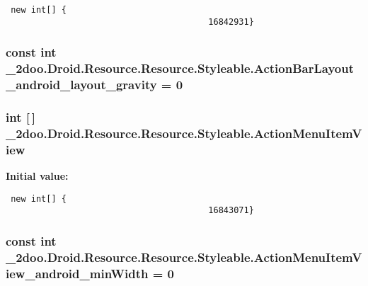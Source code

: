 \begin{Code}\begin{verbatim} new int[] {
                                        16842931}
\end{verbatim}
\end{Code}
\hypertarget{class__2doo_1_1_droid_1_1_resource_1_1_styleable_0f6e770bdc63ad746aa4b029ad1a8c27}{
\subsubsection[{ActionBarLayout\_\-android\_\-layout\_\-gravity}]{\setlength{\rightskip}{0pt plus 5cm}const int \_\-2doo.Droid.Resource.Resource.Styleable.ActionBarLayout\_\-android\_\-layout\_\-gravity = 0}}
\label{class__2doo_1_1_droid_1_1_resource_1_1_styleable_0f6e770bdc63ad746aa4b029ad1a8c27}


\hypertarget{class__2doo_1_1_droid_1_1_resource_1_1_styleable_e077d3be702fe927951e38340a8e8f7c}{
\subsubsection[{ActionMenuItemView}]{\setlength{\rightskip}{0pt plus 5cm}int \mbox{[}$\,$\mbox{]} \_\-2doo.Droid.Resource.Resource.Styleable.ActionMenuItemView}}
\label{class__2doo_1_1_droid_1_1_resource_1_1_styleable_e077d3be702fe927951e38340a8e8f7c}


\textbf{Initial value:}

\begin{Code}\begin{verbatim} new int[] {
                                        16843071}
\end{verbatim}
\end{Code}
\hypertarget{class__2doo_1_1_droid_1_1_resource_1_1_styleable_618a6b9da59dffd6b124b9b96dbab4d6}{
\subsubsection[{ActionMenuItemView\_\-android\_\-minWidth}]{\setlength{\rightskip}{0pt plus 5cm}const int \_\-2doo.Droid.Resource.Resource.Styleable.ActionMenuItemView\_\-android\_\-minWidth = 0}}
\label{class__2doo_1_1_droid_1_1_resource_1_1_styleable_618a6b9da59dffd6b124b9b96dbab4d6}


